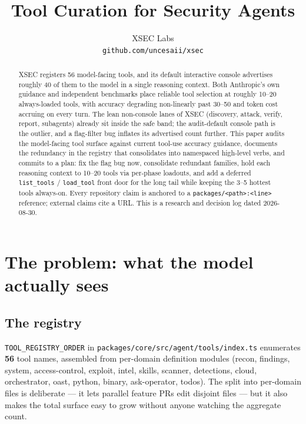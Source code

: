 \documentclass[11pt]{article}
\title{Tool Curation for Security Agents}
\author{
  XSEC Labs \\
  \texttt{github.com/uncesaii/xsec}
}
\date{}
\begin{document}
\maketitle

\begin{abstract}
XSEC registers 56 model-facing tools, and its default interactive console
advertises roughly 40 of them to the model in a single reasoning context. Both
Anthropic's own guidance and independent benchmarks place reliable tool
selection at roughly 10--20 always-loaded tools, with accuracy degrading
non-linearly past 30--50 and token cost accruing on every turn. The lean
non-console lanes of XSEC (discovery, attack, verify, report, subagents) already
sit inside the safe band; the audit-default console path is the outlier, and a
flag-filter bug inflates its advertised count further. This paper audits the
model-facing tool surface against current tool-use accuracy guidance, documents
the redundancy in the registry that consolidates into namespaced high-level
verbs, and commits to a plan: fix the flag bug now, consolidate redundant
families, hold each reasoning context to 10--20 tools via per-phase loadouts,
and add a deferred \texttt{list\_tools} / \texttt{load\_tool} front door for the
long tail while keeping the 3--5 hottest tools always-on. Every repository claim
is anchored to a \texttt{packages/<path>:<line>} reference; external claims cite
a URL. This is a research and decision log dated 2026-08-30.
\end{abstract}

\section{The problem: what the model actually sees}

\subsection{The registry}

\texttt{TOOL\_REGISTRY\_ORDER} in \texttt{packages/core/src/agent/tools/index.ts}
enumerates \textbf{56} tool names, assembled from per-domain definition modules
(recon, findings, system, access-control, exploit, intel, skills, scanner,
detections, cloud, orchestrator, oast, python, binary, ask-operator, todos). The
split into per-domain files is deliberate --- it lets parallel feature PRs edit
disjoint files --- but it also makes the total surface easy to grow without
anyone watching the aggregate count.
\end{document}
